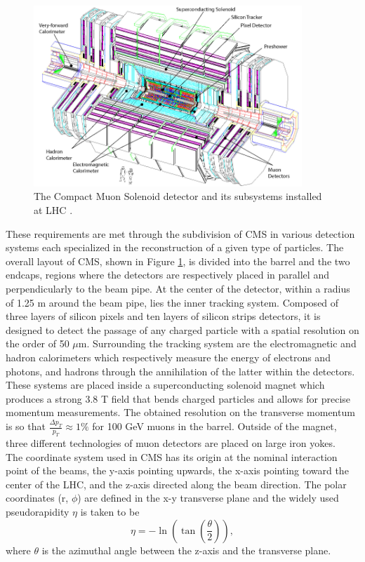     \begin{figure}[h!]
      \centering
      \includegraphics[width=0.9\textwidth]{img/I-3-cms/cms.pdf}
      \caption{The Compact Muon Solenoid detector and its subsystems installed at LHC \cite{1748-0221-3-08-S08004}.}
      \label{fig:I-3-cms-global-view}
    \end{figure}

    These requirements are met through the subdivision of CMS in various detection systems each specialized in the reconstruction of a given type of particles. The overall layout of CMS, shown in Figure \ref{fig:I-3-cms-global-view}, is divided into the barrel and the two endcaps, regions where the detectors are respectively placed in parallel and perpendicularly to the beam pipe. At the center of the detector, within a radius of 1.25 m around the beam pipe, lies the inner tracking system. Composed of three layers of silicon pixels and ten layers of silicon strips detectors, it is designed to detect the passage of any charged particle with a spatial resolution on the order of 50 $\mu$m. Surrounding the tracking system are the electromagnetic and hadron calorimeters which respectively measure the energy of electrons and photons, and hadrons through the annihilation of the latter within the detectors. These systems are placed inside a superconducting solenoid magnet which produces a strong 3.8 T field that bends charged particles and allows for precise momentum measurements. The obtained resolution on the transverse momentum is so that $\frac{\Delta p_T}{p_T} \approx 1\% $ for 100 GeV muons in the barrel. Outside of the magnet, three different technologies of muon detectors are placed on large iron yokes. \\

    The coordinate system used in CMS has its origin at the nominal interaction point of the beams, the y-axis pointing upwards, the x-axis pointing toward the center of the LHC, and the z-axis directed along the beam direction. The polar coordinates (r, $ \phi $) are defined in the x-y transverse plane and the widely used pseudorapidity $ \eta $ is taken to be
    \begin{equation}
      \eta = - \ln\left( \tan\left( \frac{\theta}{2} \right) \right) ,
    \end{equation}
    where $ \theta $ is the azimuthal angle between the z-axis and the transverse plane.

